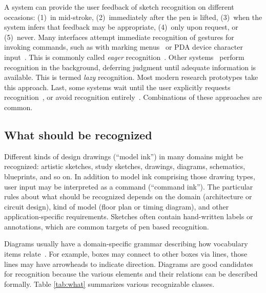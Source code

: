 A system can provide the user feedback of sketch recognition on
different occasions: (1)~in mid-stroke, (2)~immediately after the pen
is lifted, (3)~when the system infers that feedback may be
appropriate, (4)~only upon request, or (5)~never. Many interfaces
attempt immediate recognition of gestures for invoking commands, such
as with marking menus~\cite{kurtenbach-marking-menus} or PDA device
character input~\cite{palm}. This is commonly called \textit{eager}
recognition~\cite{blostein-diagrams-review}. Other
systems~\cite{gross-ecn-uist,igarashi-suggestive,alvarado-sketchread-uist}
perform recognition in the background, deferring judgment until
adequate information is available. This is termed \textit{lazy}
recognition. Most modern research prototypes take this approach. Last,
some systems wait until the user explicitly requests
recognition~\cite{landay-silk}, or avoid recognition
entirely~\cite{forbus-nusketch-battlespace}. Combinations of these
approaches are common.

\subsection{What should be recognized}
\label{sec:recognition-what}

Different kinds of design drawings (``model ink'') in many domains
might be recognized: artistic sketches, study sketches, drawings,
diagrams, schematics, blueprints, and so on. In addition to model ink
comprising those drawing types, user input may be interpreted as a
command (``command ink''). The particular rules about what should be
recognized depends on the domain (architecture or circuit design),
kind of model (floor plan or timing diagram), and other
application-specific requirements. Sketches often contain hand-written
labels or annotations, which are common targets of pen based
recognition.


Diagrams usually have a domain-specific grammar describing how
vocabulary items relate~\cite{lakin-vmacs-89}. For example, boxes may
connect to other boxes via lines, those lines may have arrowheads to
indicate direction. Diagrams are good candidates for recognition
because the various elements and their relations can be described
formally. Table \ref{tab:what} summarizes various recognizable
classes.

